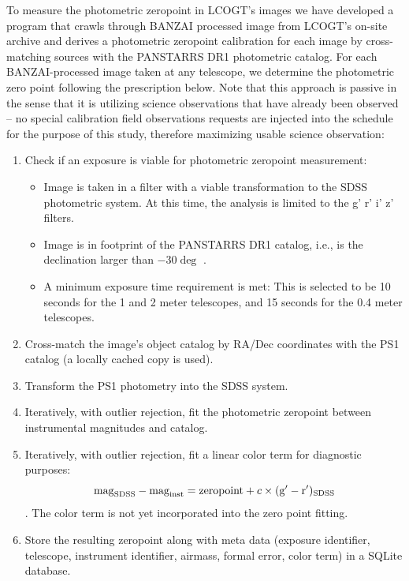 \documentclass[]{spieman}
\begin{document}
To measure the photometric zeropoint in LCOGT's images we have developed a program that crawls through BANZAI
processed image from LCOGT's on-site archive and derives a photometric zeropoint calibration for
each image by cross-matching sources with the PANSTARRS DR1 photometric catalog\cite{chambers2016}. 
For each BANZAI-processed image taken at any telescope, we determine the photometric zero point 
following the prescription below. Note that this approach is passive in the sense that it is utilizing 
science observations that have already been observed -- no special calibration field observations 
requests are injected into the schedule for the purpose of this study, therefore maximizing usable 
science observation:

 
\begin{enumerate}
\item Check if an exposure is viable for photometric zeropoint measurement:
  \begin{itemize}
   \item Image is taken in a filter with a viable transformation to the SDSS
         photometric system. At this time, the analysis is limited to the g' r' i' z' filters.
   \item Image is in footprint of the PANSTARRS DR1 catalog, i.e., is the declination larger than
         $-30\deg$ .
   \item A minimum exposure time requirement is met: This is selected to be 10 seconds for the 1 and 2
        meter telescopes, and 15 seconds for the 0.4 meter telescopes.
\end{itemize}
   
\item Cross-match the image's object catalog by RA/Dec coordinates with the PS1 catalog (a locally cached
copy is used).
\item Transform the PS1 photometry into the SDSS system\cite{finkbeiner2016}.
\item Iteratively, with outlier rejection, fit the photometric zeropoint between instrumental
magnitudes and catalog.
\item Iteratively, with outlier rejection, fit a linear color term for diagnostic purposes: 
$$ {\rm mag}_{\rm SDSS} - {\rm mag}_{\rm inst} = {\rm zeropoint} + c \times ({\rm g'}-{ \rm
r'})_{\rm SDSS}$$.
 The color term is not yet incorporated into the zero point fitting.
\item Store the resulting zeropoint along with meta data (exposure identifier, telescope, instrument
identifier, airmass, formal error, color term) in a SQLite database.
\end{enumerate}
\end{document}
